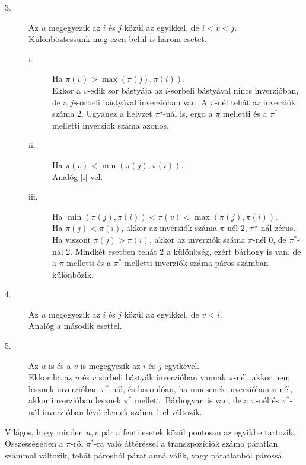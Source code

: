 \documentclass[9pt, a4paper, showtrims]{memoir}
\makeatletter
\renewenvironment{proof}[1][\proofname]
    {\par\pushQED{\qed}%
    \normalfont \topsep6\p@\@plus6\p@\relax
    \trivlist
    \item[\hskip\labelsep
        \itshape
    #1\@addpunct{:}]\ignorespaces}
    {\popQED\endtrivlist\@endpefalse}
\theoremstyle{plain}
\theoremstyle{remark}
\theoremstyle{definition}
\makeatother
\begin{document}
\begin{proof}
\begin{description}
    \item[3.]  Az $u$ megegyezik az $i$ és $j$ közül az egyikkel, de $i<v<j.$\\
        Különböztessünk meg ezen belül is három esetet.
        \begin{description}
            \item[i.]  Ha $\pi \left( v\right) >
                       \max \left( \pi \left( j\right) ,\pi\left( i\right) \right)$.\\
                Ekkor a $v$-edik sor bástyája az $i$-sorbeli bástyával nincs inverzióban,
                de a $j$-sorbeli bástyával inverzióban van. 
                A $\pi$-nél tehát az inverziók száma 2.
                Ugyanez a helyzet $\pi^\star$-nál is, 
                ergo a $\pi $ melletti és a $\pi ^{\ast }$ melletti inverziók száma azonos.

            \item[ii.]  Ha $\pi \left( v\right) <
                \min \left( \pi \left( j\right) ,\pi \left( i\right) \right) .$\\
                Analóg [i]-vel.

            \item[iii.]  Ha $\min \left( \pi \left( j\right) ,\pi \left( i\right)\right) 
                        <
                        \pi \left( v\right) 
                        <
                        \max \left( \pi \left( j\right) ,\pi \left(i\right) \right) .$\\
                Ha $\pi\left( j \right)<\pi\left( i \right)$, akkor az inverziók száma $\pi$-nél 2,
                $\pi^\star$-nál zérus.
                Ha viszont $\pi\left( j \right)>\pi\left( i \right)$, akkor az inverziók száma $\pi$-nél 0,
                de $\pi^\ast$-nál 2.
                Mindkét esetben tehát 2 a különbség, 
                ezért bárhogy is van, 
                de a $\pi $ melletti és a $\pi ^{\ast }$ melletti inverziók száma páros számban különbözik.
        \end{description}

    \item[4.]  Az $u$ megegyezik az $i$ és $j$ közül az egyikkel, de $v<i.$\\
        Analóg a második esettel.

    \item[5.]  Az $u$ is és a $v$ is megegyezik az $i$ és $j$ egyikével.\\
        Ekkor ha az $u$ és $v$ sorbeli bástyák inverzióban vannak $\pi$-nél,
        akkor nem lesznek inverzióban $\pi^\ast$-nál,
        és hasonlóan, ha nincsenek inverzióban $\pi$-nél,
        akkor inverzióban lesznek $\pi^\ast$ mellett.
        Bárhogyan is van, de a $\pi$-nél és $\pi^\ast$-nál inverzióban lévő elemek száma 1-el változik.
    \end{description}
    Világos, hogy minden $u,v$ pár a fenti esetek közül pontosan az egyikbe tartozik.
    Összességében a $\pi$-ről $\pi^\ast$-ra való áttéréssel a transzpozíciók száma páratlan számmal változik,
    tehát párosból páratlanná válik, vagy páratlanból párossá.
\end{proof}
\end{document}
